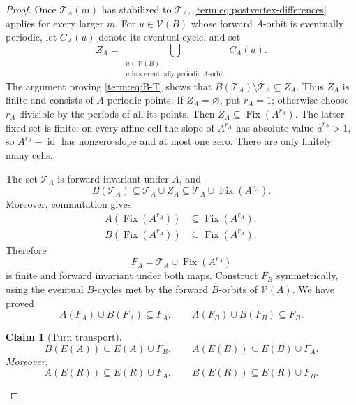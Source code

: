 \documentclass[11pt]{article}
\newtheorem{claim}[theorem]{Claim}
\theoremstyle{definition}
\theoremstyle{remark}
\newcommand{\Fix}{\operatorname{Fix}}
\newcommand{\id}{\operatorname{id}}
\begin{document}
\begin{proof}
Once $\mathcal T_A(m)$ has stabilized to $\mathcal T_A$,
\eqref{term:eq:postvertex-differences} applies for every larger $m$.  For
$u\in\mathcal V(B)$ whose forward $A$-orbit is eventually periodic, let
$C_A(u)$ denote its eventual cycle, and set
\[
 Z_A=\bigcup_{\substack{u\in\mathcal V(B)\\
                 u\text{ has eventually periodic }A\text{-orbit}}}C_A(u).
\]
The argument proving \eqref{term:eq:B-T} shows that
$B(\mathcal T_A)\setminus\mathcal T_A\subseteq Z_A$.  Thus $Z_A$ is finite
and consists of $A$-periodic points.  If \(Z_A=\varnothing\), put \(r_A=1\);
otherwise choose \(r_A\) divisible by the periods of all its points.  Then
\(Z_A\subseteq\Fix(A^{r_A})\).  The latter fixed set is finite: on every
affine cell the slope of \(A^{r_A}\) has absolute value
\(\widehat a^{r_A}>1\), so \(A^{r_A}-\id\) has nonzero slope and at most one
zero.  There are only finitely many cells.

The set \(\mathcal T_A\) is forward invariant under \(A\), and
\[
 B(\mathcal T_A)\subseteq\mathcal T_A\cup Z_A
 \subseteq\mathcal T_A\cup\Fix(A^{r_A}).
\]
Moreover, commutation gives
\[
\begin{split}
 A(\Fix(A^{r_A}))&\subseteq\Fix(A^{r_A}),\\
 B(\Fix(A^{r_A}))&\subseteq\Fix(A^{r_A}).
\end{split}
\]
Therefore
\[
 F_A=\mathcal T_A\cup\Fix(A^{r_A})
\]
is finite and forward invariant under both maps.  Construct \(F_B\)
symmetrically, using the eventual \(B\)-cycles met by the forward \(B\)-orbits
of \(\mathcal V(A)\).  We have proved
\begin{equation}\label{term:eq:F-invariance}
 A(F_A)\cup B(F_A)\subseteq F_A,\qquad
 A(F_B)\cup B(F_B)\subseteq F_B.
\end{equation}

\begin{claim}[Turn transport]\label{clm:pl-turn-transport}
\begin{equation}\label{term:eq:turn-transport}
 B(E(A))\subseteq E(A)\cup F_B,\qquad
 A(E(B))\subseteq E(B)\cup F_A.
\end{equation}
Moreover,
\begin{equation}\label{term:eq:R-turn-transport}
 A(E(R))\subseteq E(R)\cup F_A,\qquad
 B(E(R))\subseteq E(R)\cup F_B.
\end{equation}
\end{claim}


\end{proof}
\end{document}
